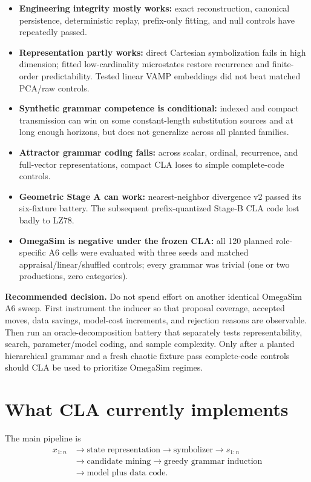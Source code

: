 \documentclass[10pt]{article}
\newcommand{\decision}{\textbf{Recommended decision.}}
\begin{document}
\begin{itemize}
\item \textbf{Engineering integrity mostly works:} exact reconstruction,
canonical persistence, deterministic replay, prefix-only fitting, and null
controls have repeatedly passed.
\item \textbf{Representation partly works:} direct Cartesian symbolization
fails in high dimension; fitted low-cardinality microstates restore recurrence
and finite-order predictability. Tested linear VAMP embeddings did not beat
matched PCA/raw controls.
\item \textbf{Synthetic grammar competence is conditional:} indexed and
compact transmission can win on some constant-length substitution sources and
at long enough horizons, but does not generalize across all planted families.
\item \textbf{Attractor grammar coding fails:} across scalar, ordinal,
recurrence, and full-vector representations, compact CLA loses to simple
complete-code controls.
\item \textbf{Geometric Stage A can work:} nearest-neighbor divergence v2
passed its six-fixture battery. The subsequent prefix-quantized Stage-B CLA
code lost badly to LZ78.
\item \textbf{OmegaSim is negative under the frozen CLA:} all 120 planned
role-specific A6 cells were evaluated with three seeds and matched
appraisal/linear/shuffled controls; every grammar was trivial (one or two
productions, zero categories).
\end{itemize}

\decision{} Do not spend effort on another identical OmegaSim A6 sweep.
First instrument the inducer so that proposal coverage, accepted moves, data
savings, model-cost increments, and rejection reasons are observable. Then run
an oracle-decomposition battery that separately tests representability,
search, parameter/model coding, and sample complexity. Only after a planted
hierarchical grammar and a fresh chaotic fixture pass complete-code controls
should CLA be used to prioritize OmegaSim regimes.

\section{What CLA currently implements}

The main pipeline is
\[
\begin{aligned}
x_{1:n} &\rightarrow \text{state representation}
\rightarrow \text{symbolizer} \rightarrow s_{1:n}\\
&\rightarrow \text{candidate mining}
\rightarrow \text{greedy grammar induction}\\
&\rightarrow \text{model plus data code}.
\end{aligned}
\]
\end{document}
